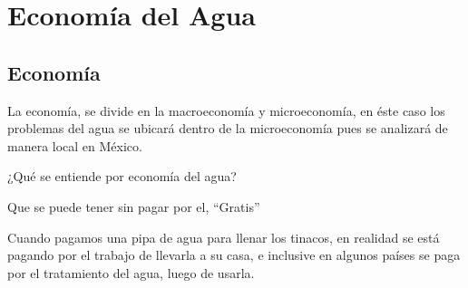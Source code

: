 \chapter{Economía del Agua}




\section{Economía}
La economía, se divide en la macroeconomía y microeconomía, en éste caso los problemas del agua se ubicará dentro de la microeconomía pues se analizará de manera local en México.

¿Qué se entiende por economía del agua?
\begin{definition}
    Que se puede tener sin pagar por el, ``Gratis''
\end{definition}
Cuando pagamos una pipa de agua para llenar los tinacos, en realidad se está pagando por el trabajo de llevarla a su casa, e inclusive en algunos países se paga por el tratamiento del agua, luego de usarla.

